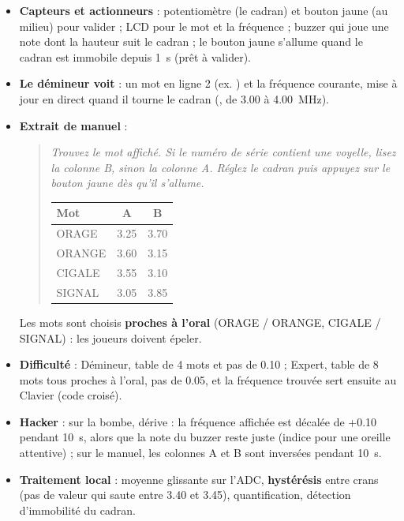 \documentclass[11pt,a4paper]{article}
\newcommand{\code}[1]{\texttt{\detokenize{#1}}}
\newenvironment{manuel}{\begin{quote}\itshape}{\end{quote}}
\begin{document}
\begin{itemize}
  \item \textbf{Capteurs et actionneurs} : potentiomètre (le \og cadran\fg{}) et bouton jaune (au milieu) pour valider ; LCD pour le mot et la fréquence ; buzzer qui joue une note dont la hauteur suit le cadran ; le bouton jaune s'allume quand le cadran est immobile depuis 1~s (prêt à valider).
  \item \textbf{Le démineur voit} : un mot en ligne 2 (ex. \code{ORAGE}) et la fréquence courante, mise à jour en direct quand il tourne le cadran (\code{3.40 MHz}, de 3.00 à 4.00~MHz).
  \item \textbf{Extrait de manuel} :
  \begin{manuel}
    Trouvez le mot affiché. Si le numéro de série contient une voyelle, lisez la colonne B, sinon la colonne A. Réglez le cadran puis appuyez sur le bouton jaune dès qu'il s'allume.

    \upshape\small
    \begin{tabular}{lcc}
      \toprule
      \textbf{Mot} & \textbf{A} & \textbf{B} \\
      \midrule
      ORAGE & 3.25 & 3.70 \\
      ORANGE & 3.60 & 3.15 \\
      CIGALE & 3.55 & 3.10 \\
      SIGNAL & 3.05 & 3.85 \\
      \bottomrule
    \end{tabular}
  \end{manuel}
  Les mots sont choisis \textbf{proches à l'oral} (ORAGE / ORANGE, CIGALE / SIGNAL) : les joueurs doivent épeler.
  \item \textbf{Difficulté} : Démineur, table de 4 mots et pas de 0.10 ; Expert, table de 8 mots tous proches à l'oral, pas de 0.05, et la fréquence trouvée sert ensuite au Clavier (\og code croisé\fg{}).
  \item \textbf{Hacker} : sur la bombe, \og dérive\fg{} : la fréquence affichée est décalée de +0.10 pendant 10~s, alors que la note du buzzer reste juste (indice pour une oreille attentive) ; sur le manuel, les colonnes A et B sont inversées pendant 10~s.
  \item \textbf{Traitement local} : moyenne glissante sur l'ADC, \textbf{hystérésis} entre crans (pas de valeur qui saute entre 3.40 et 3.45), quantification, détection d'immobilité du cadran.
\end{itemize}

\end{document}
